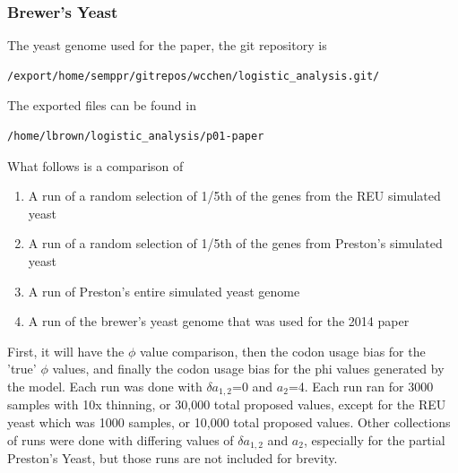 \subsubsection{Brewer's Yeast}
The yeast genome used for the paper, the git repository is 
\begin{verbatim}
/export/home/semppr/gitrepos/wcchen/logistic_analysis.git/
\end{verbatim}

The exported files can be found in 

\begin{verbatim}
/home/lbrown/logistic_analysis/p01-paper
\end{verbatim}

What follows is a comparison of 

\begin{enumerate}
\item A run of a random selection of 1/5th of the genes from the REU simulated yeast
\item A run of a random selection of 1/5th of the genes from Preston's simulated yeast
\item A run of Preston's entire simulated yeast genome
\item A run of the brewer's yeast genome that was used for the 2014 paper
\end{enumerate}

First, it will have the $\phi$ value comparison, then the codon usage bias for the 'true' $\phi$ values, and finally the codon usage bias for the phi values generated by the model. Each run was done with $\delta a_{1,2}$=0 and $a_2$=4. Each run ran for 3000 samples with 10x thinning, or 30,000 total proposed values, except for the REU yeast which was 1000 samples, or 10,000 total proposed values. Other collections of runs were done with differing values of $\delta a_{1,2}$ and $a_2$, especially for the partial Preston's Yeast, but those runs are not included for brevity.


















